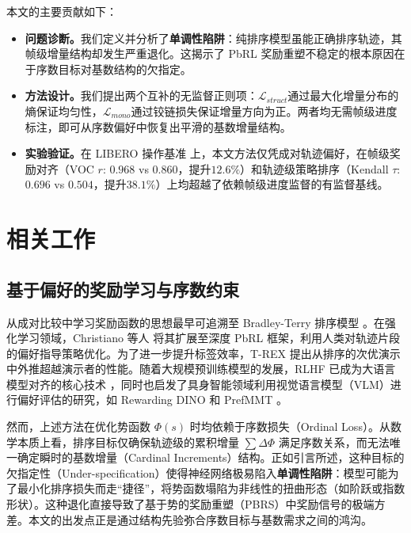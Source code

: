 本文的主要贡献如下：
\begin{itemize}[leftmargin=*,noitemsep]
    \item \textbf{问题诊断。}我们定义并分析了\textbf{单调性陷阱}：纯排序模型虽能正确排序轨迹，其帧级增量结构却发生严重退化。这揭示了 PbRL 奖励重塑不稳定的根本原因在于序数目标对基数结构的欠指定。
    \item \textbf{方法设计。}我们提出两个互补的无监督正则项：$\mathcal{L}_{struct}$通过最大化增量分布的熵保证均匀性，$\mathcal{L}_{mono}$通过铰链损失保证增量方向为正。两者均无需帧级进度标注，即可从序数偏好中恢复出平滑的基数增量结构。
    \item \textbf{实验验证。}在 LIBERO 操作基准 \cite{liu2023libero} 上，本文方法仅凭成对轨迹偏好，在帧级奖励对齐（VOC $r$: $0.968$ vs $0.860$，提升$12.6\%$）和轨迹级策略排序（Kendall $\tau$: $0.696$ vs $0.504$，提升$38.1\%$）上均超越了依赖帧级进度监督的有监督基线。
\end{itemize}

\section{相关工作}

\subsection{基于偏好的奖励学习与序数约束}

从成对比较中学习奖励函数的思想最早可追溯至 Bradley-Terry 排序模型 \cite{bradley1952}。在强化学习领域，Christiano 等人 \cite{christiano2017deep} 将其扩展至深度 PbRL 框架，利用人类对轨迹片段的偏好指导策略优化。为了进一步提升标签效率，T-REX \cite{brown2019extrapolating} 提出从排序的次优演示中外推超越演示者的性能。随着大规模预训练模型的发展，RLHF 已成为大语言模型对齐的核心技术 \cite{ouyang2022training}，同时也启发了具身智能领域利用视觉语言模型（VLM）进行偏好评估的研究，如 Rewarding DINO \cite{krack2026rewarding} 和 PrefMMT \cite{zhao2025}。

然而，上述方法在优化势函数 $\Phi(s)$ 时均依赖于序数损失（Ordinal Loss）。从数学本质上看，排序目标仅确保轨迹级的累积增量 $\sum \Delta\Phi$ 满足序数关系，而无法唯一确定瞬时的基数增量（Cardinal Increments）结构。正如引言所述，这种目标的欠指定性（Under-specification）使得神经网络极易陷入\textbf{单调性陷阱}：模型可能为了最小化排序损失而走“捷径”，将势函数塌陷为非线性的扭曲形态（如阶跃或指数形状）。这种退化直接导致了基于势的奖励重塑（PBRS）中奖励信号的极端方差。本文的出发点正是通过结构先验弥合序数目标与基数需求之间的鸿沟。


